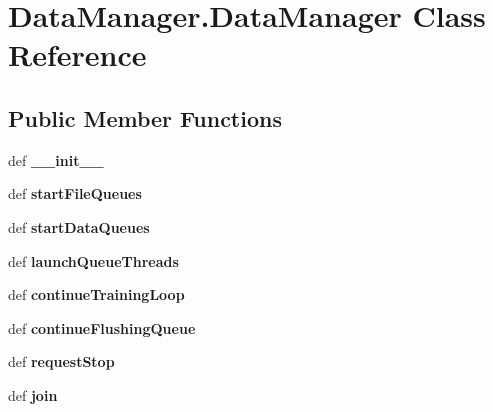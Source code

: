 \hypertarget{classDataManager_1_1DataManager}{\section{Data\-Manager.\-Data\-Manager Class Reference}
\label{classDataManager_1_1DataManager}
}
\subsection*{Public Member Functions}
\begin{DoxyCompactItemize}
\item 
\hypertarget{classDataManager_1_1DataManager_a6720284570316a8b502e468074e22d28}{def {\bfseries \-\_\-\-\_\-init\-\_\-\-\_\-}}\label{classDataManager_1_1DataManager_a6720284570316a8b502e468074e22d28}

\item 
\hypertarget{classDataManager_1_1DataManager_adfc56295e24739346eb4673877ae0277}{def {\bfseries start\-File\-Queues}}\label{classDataManager_1_1DataManager_adfc56295e24739346eb4673877ae0277}

\item 
\hypertarget{classDataManager_1_1DataManager_a8dc65af6fee5bd5bb20f0191848fa2fb}{def {\bfseries start\-Data\-Queues}}\label{classDataManager_1_1DataManager_a8dc65af6fee5bd5bb20f0191848fa2fb}

\item 
\hypertarget{classDataManager_1_1DataManager_adc8376ebbcc8fd94f8e7cc2b5ab2e16d}{def {\bfseries launch\-Queue\-Threads}}\label{classDataManager_1_1DataManager_adc8376ebbcc8fd94f8e7cc2b5ab2e16d}

\item 
\hypertarget{classDataManager_1_1DataManager_a7c93e51eb6673ea46f7fb694b65136c3}{def {\bfseries continue\-Training\-Loop}}\label{classDataManager_1_1DataManager_a7c93e51eb6673ea46f7fb694b65136c3}

\item 
\hypertarget{classDataManager_1_1DataManager_ab05ed3527245d208513637a4985415cd}{def {\bfseries continue\-Flushing\-Queue}}\label{classDataManager_1_1DataManager_ab05ed3527245d208513637a4985415cd}

\item 
\hypertarget{classDataManager_1_1DataManager_a2b48ff573d4ebab478b2e27190a5d069}{def {\bfseries request\-Stop}}\label{classDataManager_1_1DataManager_a2b48ff573d4ebab478b2e27190a5d069}

\item 
\hypertarget{classDataManager_1_1DataManager_a43c7d931d591e95fd4d8572d008dd5e6}{def {\bfseries join}}\label{classDataManager_1_1DataManager_a43c7d931d591e95fd4d8572d008dd5e6}

\end{DoxyCompactItemize}
